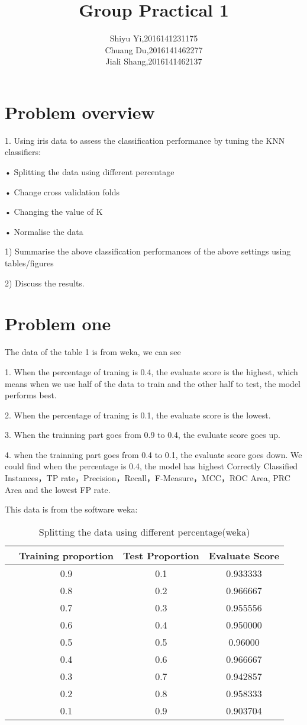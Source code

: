 \documentclass[a4pper,11pt,onecolumn]{article}
\title{Group Practical 1 }
\author[*]{Shiyu Yi,2016141231175\\Chuang Du,2016141462277\\Jiali Shang,2016141462137}
\begin{document}
\maketitle

\section{Problem overview}
1. Using iris data to assess the classification performance by tuning the KNN
classifiers:

• Splitting the data using different percentage

• Change cross validation folds

• Changing the value of K

• Normalise the data

1) Summarise the above classification performances of the above settings
using tables/figures 

2) Discuss the results.
 
\section{Problem one}

The data of the table 1 is from weka, we can see 

1. When the percentage of traning is 0.4, the evaluate score is the highest, which means when we use half of the data to train and the other half to test, the model performs best.

2. When the percentage of traning is 0.1, the evaluate score is the lowest.

3. When the trainning part goes from 0.9 to 0.4, the evaluate score goes up.

4. when the trainning part goes from 0.4 to 0.1, the evaluate score goes down.
We could find when the percentage is 0.4, the model has highest Correctly Classified Instances，TP rate，Precision，Recall，F-Measure，MCC，ROC Area, PRC Area and the lowest FP rate.


This data is from the software weka:
 
\begin{table}[h]  %
	\centering  %
	\caption{Splitting the data using different percentage(weka)}  %
	\begin{tabular}{cccc}  %
		\hline
		\hline
		& Training proportion & Test Proportion & Evaluate Score \\ [0.5ex] 
		\hline
		& 0.9 & 0.1 & 0.933333   \\
		& 0.8 & 0.2 & 0.966667  \\
		& 0.7 & 0.3 & 0.955556  \\
		& 0.6 & 0.4 & 0.950000    \\
		& 0.5 & 0.5 & 0.96000 \\
		& 0.4 & 0.6 & 0.966667\\
		& 0.3 & 0.7 & 0.942857 \\
		& 0.2 & 0.8 & 0.958333  \\
		& 0.1 & 0.9 & 0.903704  \\
		\hline
		\hline
	\end{tabular}
\end{table}
\end{document}
